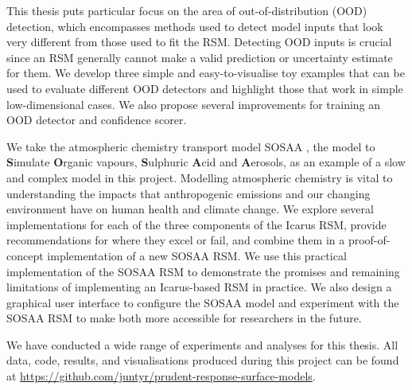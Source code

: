 This thesis puts particular focus on the area of out-of-distribution (OOD) detection, which encompasses methods used to detect model inputs that look very different from those used to fit the RSM. Detecting OOD inputs is crucial since an RSM generally cannot make a valid prediction or uncertainty estimate for them. We develop three simple and easy-to-visualise toy examples that can be used to evaluate different OOD detectors and highlight those that work in simple low-dimensional cases. We also propose several improvements for training an OOD detector and confidence scorer.

\newpar We take the atmospheric chemistry transport model SOSAA \cite{sosa-description-2011}, the model to \textbf{S}imulate \textbf{O}rganic vapours, \textbf{S}ulphuric \textbf{A}cid and \textbf{A}erosols, as an example of a slow and complex model in this project. Modelling atmospheric chemistry is vital to understanding the impacts that anthropogenic emissions and our changing environment have on human health and climate change. We explore several implementations for each of the three components of the Icarus RSM, provide recommendations for where they excel or fail, and combine them in a proof-of-concept implementation of a new SOSAA RSM. We use this practical implementation of the SOSAA RSM to demonstrate the promises and remaining limitations of implementing an Icarus-based RSM in practice. We also design a graphical user interface to configure the SOSAA model and experiment with the SOSAA RSM to make both more accessible for researchers in the future.

\newpar We have conducted a wide range of experiments and analyses for this thesis. All data, code, results, and visualisations produced during this project can be found at \href{https://github.com/juntyr/prudent-response-surface-models}{https://github.com/juntyr/prudent-response-surface-models}.

\newpage

